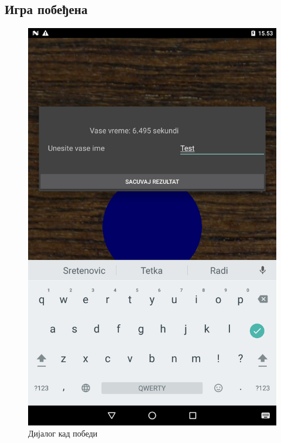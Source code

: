 \subsection{Игра побеђена}
\begin{figure}[htb!]
\begin{center}
\includegraphics[scale=.1]{pictures/game/gameWon}
\caption{Дијалог кад победи}\label{fig:gameGameWon}
\end{center}
\end{figure}


